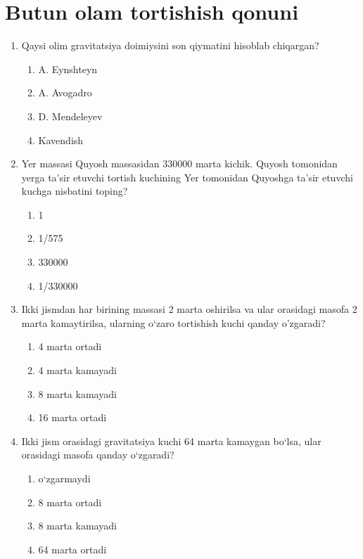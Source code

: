 \section{Butun olam tortishish qonuni}



\begin{enumerate}

\item Qaysi olim gravitatsiya doimiysini son qiymatini hisoblab chiqargan?
\begin{enumerate}[label=\Alph*)]
\item A. Eynshteyn
\item A. Avogadro
\item D. Mendeleyev
\item Kavendish
\end{enumerate}

\item Yer massasi Quyosh massasidan 330000 marta kichik. Quyosh tomonidan yerga ta'sir etuvchi tortish kuchining Yer tomonidan Quyoshga ta'sir etuvchi kuchga nisbatini toping?
\begin{enumerate}[label=\Alph*)]
\item 1
\item 1/575
\item 330000
\item 1/330000
\end{enumerate}

\item Ikki jismdan har birining massasi 2 marta oshirilsa va ular orasidagi masofa 2 marta kamaytirilsa, ularning o‘zaro tortishish kuchi qanday o'zgaradi?
\begin{enumerate}[label=\Alph*)]
\item 4 marta ortadi
\item 4 marta kamayadi
\item 8 marta kamayadi
\item 16 marta ortadi
\end{enumerate}

\item Ikki jism orasidagi gravitatsiya kuchi 64 marta kamaygan bo‘lsa, ular orasidagi masofa qanday o‘zgaradi?
\begin{enumerate}[label=\Alph*)]
\item o‘zgarmaydi
\item 8 marta ortadi
\item 8 marta kamayadi
\item 64 marta ortadi
\end{enumerate}


\end{enumerate}
